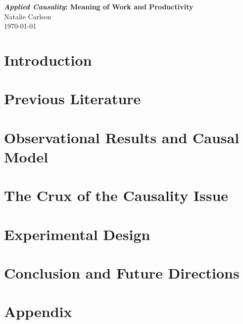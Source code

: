 \documentclass[12pt]{article}
\begin{document}
\begin{center}
  \Large \textbf{\textit{Applied Causality}: Meaning of Work and Productivity} \\
  \vspace{0.1in}
  \normalsize Natalie Carlson \\
  \today
\end{center}


\section{Introduction}

\section{Previous Literature}

\section{Observational Results and Causal Model}

\section{The Crux of the Causality Issue}

\section{Experimental Design}

\section{Conclusion and Future Directions}

\section*{Appendix}
\end{document}

